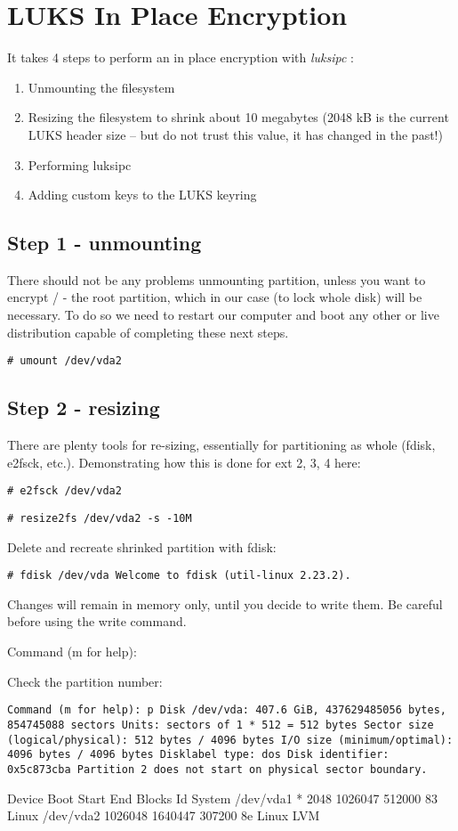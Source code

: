 \chapter{LUKS In Place Encryption}
\label{luksipc}
It takes 4 steps to perform an in place encryption with {\it luksipc} :
\begin{enumerate}
    \item Unmounting the filesystem
    \item Resizing the filesystem to shrink about 10 megabytes (2048 kB is the current LUKS header size -- but do not trust this value, it has changed in the past!)
    \item Performing luksipc
    \item Adding custom keys to the LUKS keyring
\end{enumerate}

\section{Step 1 - unmounting}

There should not be any problems unmounting partition, unless you want to encrypt / - the root partition, which in our case (to lock whole disk) will be necessary.
To do so we need to restart our computer and boot any other or live distribution capable of completing these next steps.

{\tt \# umount /dev/vda2}

\section{Step 2 - resizing}

There are plenty tools for re-sizing, essentially for partitioning as whole (fdisk, e2fsck, etc.).
Demonstrating how this is done for ext 2, 3, 4 here:

{\tt \# e2fsck /dev/vda2}

{\tt \# resize2fs /dev/vda2 -s -10M}

Delete and recreate shrinked partition with fdisk:

{\tt \# fdisk /dev/vda
Welcome to fdisk (util-linux 2.23.2).

Changes will remain in memory only, until you decide to write them. Be careful before using the write command.

Command (m for help):}

Check the partition number:

{\tt Command (m for help): p
Disk /dev/vda: 407.6 GiB, 437629485056 bytes, 854745088 sectors
Units: sectors of 1 * 512 = 512 bytes
Sector size (logical/physical): 512 bytes / 4096 bytes
I/O size (minimum/optimal): 4096 bytes / 4096 bytes
Disklabel type: dos
Disk identifier: 0x5c873cba
Partition 2 does not start on physical sector boundary.

Device        Boot        Start     End         Blocks      Id    System
/dev/vda1      *          2048      1026047     512000      83    Linux
/dev/vda2                 1026048   1640447     307200      8e    Linux LVM}

